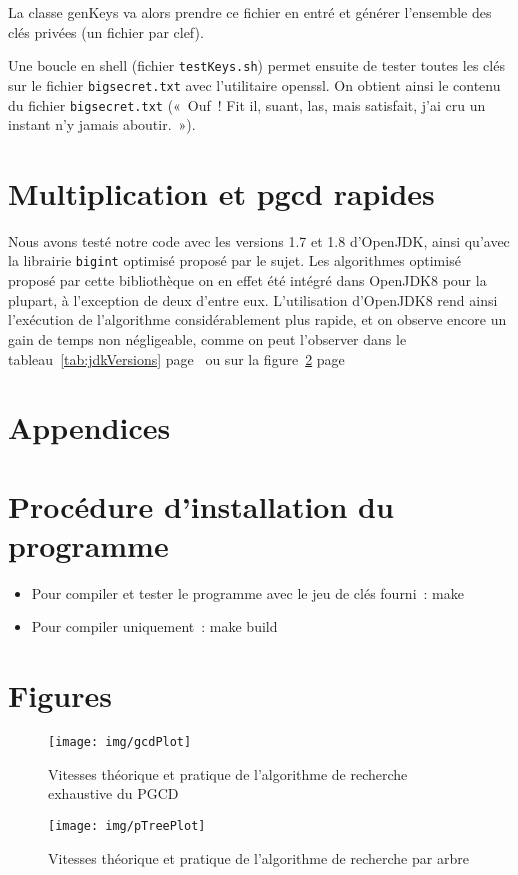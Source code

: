 \documentclass[a4paper,10pt]{article}
\begin{document}
  La classe genKeys va alors prendre ce fichier en entré et générer l'ensemble des clés privées (un fichier par clef).
  
  Une boucle en shell (fichier \texttt{testKeys.sh}) permet ensuite de tester toutes les clés sur le fichier \texttt{bigsecret.txt} avec l'utilitaire openssl. On obtient ainsi le contenu du fichier \texttt{bigsecret.txt} («~Ouf~! Fit il, suant, las, mais satisfait, j'ai cru un instant n'y jamais aboutir.~»).

\section{Multiplication et pgcd rapides}
  Nous avons testé notre code avec les versions 1.7 et 1.8 d'OpenJDK, ainsi qu'avec la librairie \texttt{bigint} optimisé proposé par le sujet. Les algorithmes optimisé proposé par cette bibliothèque on en effet été intégré dans OpenJDK8 pour la plupart, à l'exception de deux d'entre eux.
  L'utilisation d'OpenJDK8 rend ainsi l'exécution de l'algorithme considérablement plus rapide, et on observe encore un gain de temps non négligeable, comme on peut l'observer dans le tableau~\ref{tab:jdkVersions} page~\pageref{tab:jdkVersions}  ou sur la figure~\ref{fig:pTreeChart} page~\pageref{fig:pTreeChart}
  

\appendix
\section*{Appendices}
\section{Procédure d'installation du programme}
\begin{itemize}
  \item Pour compiler et tester le programme avec le jeu de clés fourni~:
    make

  \item Pour compiler uniquement~:
    make build
\end{itemize}

\section{Figures}
\begin{figure}[ht]
  \texttt{[image: img/gcdPlot]}
  \caption{\label{fig:gcdSpeedChart}Vitesses théorique et pratique de l'algorithme de recherche exhaustive du PGCD}
\end{figure}
\begin{figure}[ht]
  \texttt{[image: img/pTreePlot]}
  \caption{\label{fig:pTreeChart}Vitesses théorique et pratique de l'algorithme de recherche par arbre}
\end{figure}
\end{document}
